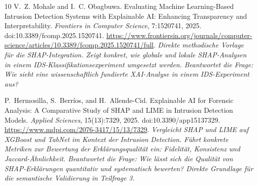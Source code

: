 \documentclass[letterpaper,twocolumn,10pt]{article}
\begin{document}
\begin{thebibliography}{10}
V.~Z. Mohale and I.~C. Obagbuwa.
\newblock Evaluating Machine Learning-Based Intrusion Detection Systems
  with Explainable AI: Enhancing Transparency and Interpretability.
\newblock \emph{Frontiers in Computer Science}, 7:1520741, 2025.
  doi:10.3389/fcomp.2025.1520741.
  \url{https://www.frontiersin.org/journals/computer-science/articles/10.3389/fcomp.2025.1520741/full}.
\newblock \textit{Direkte methodische Vorlage für die SHAP-Integration.
  Zeigt konkret, wie globale und lokale SHAP-Analysen in einem
  IDS-Klassifikationsexperiment umgesetzt werden. Beantwortet die Frage:
  Wie sieht eine wissenschaftlich fundierte XAI-Analyse in einem
  IDS-Experiment aus?}

P.~Hermosilla, S.~Berr{\'i}os, and H.~Allende-Cid.
\newblock Explainable AI for Forensic Analysis: A Comparative Study of
  SHAP and LIME in Intrusion Detection Models.
\newblock \emph{Applied Sciences}, 15(13):7329, 2025.
  doi:10.3390/app15137329.
  \url{https://www.mdpi.com/2076-3417/15/13/7329}.
\newblock \textit{Vergleicht SHAP und LIME auf XGBoost und TabNet im
  Kontext der Intrusion Detection. Führt konkrete Metriken zur Bewertung
  der Erklärungsqualität ein: Fidelität, Konsistenz und
  Jaccard-Ähnlichkeit. Beantwortet die Frage: Wie lässt sich die
  Qualität von SHAP-Erklärungen quantitativ und systematisch bewerten?
  Direkte Grundlage für die semantische Validierung in Teilfrage 3.}

\end{thebibliography}
\end{document}
